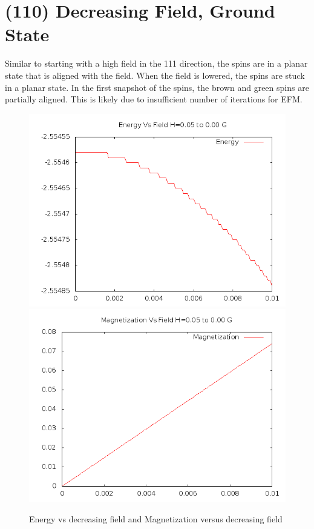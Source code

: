 \documentclass{article}
\begin{document}
\section{(110) Decreasing Field, Ground State}
Similar to starting with a high field in the 111 direction, the spins are in a planar state that is
aligned with the field. When the field is lowered, the spins are stuck in a planar state. In the first
snapshot of the spins, the brown and green spins are partially aligned. This is likely due to insufficient
number of iterations for EFM.
\begin{figure}[h]
 \centering 
\includegraphics[scale=0.3]{110/E005to000G.png}
\includegraphics[scale=0.3]{110/M005to000G.png}
\caption{Energy vs decreasing field and Magnetization versus decreasing field}
\end{figure}
\end{document}
